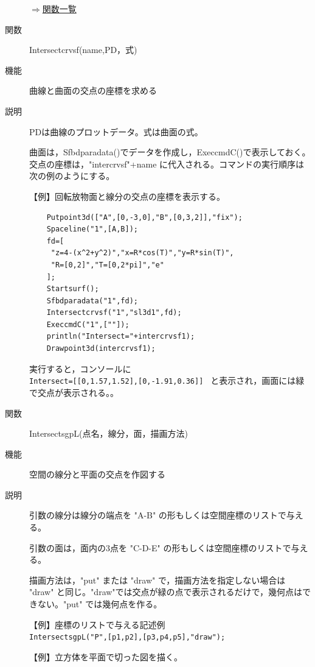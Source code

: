 \documentclass[papersize,a4paper,12pt,uplatex]{jsarticle}
\begin{document}
\begin{description}
\begin{flushright} \hyperlink{functionlist}{$\Rightarrow$関数一覧}\end{flushright}


\hypertarget{intersectcrvsf}{}
\item[関数]  Intersectcrvsf(name,PD，式)
\item[機能]  曲線と曲面の交点の座標を求める
\item[説明]  PDは曲線のプロットデータ。式は曲面の式。

  曲面は，Sfbdparadata()でデータを作成し，ExeccmdC()で表示しておく。交点の座標は，"intercrvsf"+name に代入される。コマンドの実行順序は次の例のようにする。

\vspace{\baselineskip}
【例】回転放物面と線分の交点の座標を表示する。
\begin{verbatim}
    Putpoint3d(["A",[0,-3,0],"B",[0,3,2]],"fix");
    Spaceline("1",[A,B]);
    fd=[
     "z=4-(x^2+y^2)","x=R*cos(T)","y=R*sin(T)",
     "R=[0,2]","T=[0,2*pi]","e"
    ];
    Startsurf();
    Sfbdparadata("1",fd);
    Intersectcrvsf("1","sl3d1",fd);
    ExeccmdC("1",[""]);
    println("Intersect="+intercrvsf1);
    Drawpoint3d(intercrvsf1); 
\end{verbatim}
実行すると，コンソールに\\
    \verb|Intersect=[[0,1.57,1.52],[0,-1.91,0.36]] |
と表示され，画面には緑で交点が表示される。。


\vspace{\baselineskip}
\hypertarget{intersectsgpL}{}
\item[関数]  IntersectsgpL(点名，線分，面，描画方法)
\item[機能]  空間の線分と平面の交点を作図する
\item[説明]  引数の線分は線分の端点を "A-B" の形もしくは空間座標のリストで与える。

  引数の面は，面内の3点を "C-D-E" の形もしくは空間座標のリストで与える。
  
  描画方法は，"put" または "draw" で，描画方法を指定しない場合は "draw" と同じ。"draw"では交点が緑の点で表示されるだけで，幾何点はできない。"put" では幾何点を作る。
  
\vspace{\baselineskip}
【例】座標のリストで与える記述例\\
  \verb|IntersectsgpL("P",[p1,p2],[p3,p4,p5],"draw");| 
  
\vspace{\baselineskip}
【例】立方体を平面で切った図を描く。


\end{description}
\end{document}
